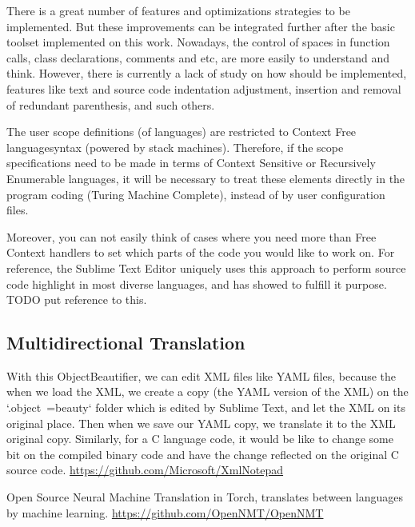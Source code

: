 There is a great number of features and optimizations strategies to be implemented.
But these improvements can be integrated further after the basic toolset implemented on this work.
Nowadays,
the control of spaces in function calls,
class declarations, comments and etc,
are more easily to understand and think.
However,
there is currently a lack of study on how should be implemented,
features like text and source code indentation adjustment,
insertion and removal of redundant parenthesis, and such others.

The user scope definitions (of languages) are restricted to Context Free language\s syntax (powered by stack machines).
Therefore,
if the scope specifications need to be made in terms of Context Sensitive or Recursively Enumerable languages,
it will be necessary to treat these elements directly in the program coding (Turing Machine Complete),
instead of by user configuration files.

Moreover,
you can not easily think of cases where you need more than Free Context handlers to set which parts of the code you
would like to work on.
For reference,
the Sublime Text Editor uniquely uses this approach to perform source code highlight in most diverse languages,
and has showed to fulfill it purpose.
TODO put reference to this.


\subsection{Multidirectional Translation}

With this ObjectBeautifier,
we can edit XML files like YAML files,
because the when we load the XML,
we create a copy (the YAML version of the XML) on the `.object~=beauty` folder which is edited by Sublime Text,
and let the XML on its original place.
Then when we save our YAML copy,
we translate it to the XML original copy.
Similarly,
for a C language code,
it would be like to change some bit on the compiled binary code and
have the change reflected on the original C source code.
\url{https://github.com/Microsoft/XmlNotepad}

Open Source Neural Machine Translation in Torch,
translates between languages by machine learning.
\url{https://github.com/OpenNMT/OpenNMT}


